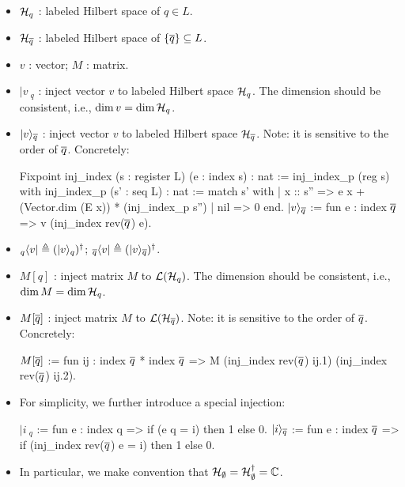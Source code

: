 \begin{itemize}
        \item ${\mathcal{H}}_q$ : labeled Hilbert space of $q\in L$.
        
        \item ${\mathcal{H}}_{\overline{q}}$ : labeled Hilbert space of $\{{\overline{q}}\}\subseteq L$.
        
        \item $v$ : vector; $M$ : matrix.
        
        \item $|v\>_q$ : inject vector $v$ to labeled Hilbert space ${\mathcal{H}}_q$. The dimension should be consistent, i.e., $\dim v = \dim {\mathcal{H}}_q$.
        
        \item $|v\rangle_{\overline{q}}$ : inject vector $v$ to labeled Hilbert space ${\mathcal{H}}_{\overline{q}}$. Note: it is sensitive to the order of ${\overline{q}}$. Concretely:
        \begin{coq}
        Fixpoint inj_index (s : register L) (e : index {s}) : nat := inj_index_p (reg s)
            with inj_index_p (s' : seq L) : nat :=
                match s' with
                | x :: s'' => e x + (Vector.dim (E x)) * (inj_index_p s'')
                | nil => 0
                end.
        $|v\rangle_{\overline{q}}$ := fun e : index {${\overline{q}}$} => v (inj_index rev(${\overline{q}}$) e).
        \end{coq}
        \vspace{-.7cm}
        
        \item ${}_q\langle v|\triangleq(|v\rangle_q)^\dag$; \quad ${}_{{\overline{q}}}\langle v| \triangleq (|v\rangle_{\overline{q}})^\dag$.
        
        \item $M[q]$ : inject matrix $M$ to ${\mathcal{L}}({\mathcal{H}}_q)$. The dimension should be consistent, i.e., $\dim M = \dim {\mathcal{H}}_q$.
        
        \item $M[{\overline{q}}]$ : inject matrix $M$ to ${\mathcal{L}}({\mathcal{H}}_{\overline{q}})$. Note: it is sensitive to the order of ${\overline{q}}$. Concretely:
        \begin{coq}
        $M[{\overline{q}}]$ := fun ij : index {${\overline{q}}$} * index {${\overline{q}}$} => M (inj_index rev(${\overline{q}}$) ij.1) (inj_index rev(${\overline{q}}$) ij.2).
        \end{coq}
        \vspace{-.7cm}
        \item For simplicity, we further introduce a special injection: 
        \begin{coq}
        $|i\>_q$ := fun e : index {q} => if (e q = i) then 1 else 0.
        $|i\rangle_{\overline{q}}$ := fun e : index {${\overline{q}}$} => if (inj_index rev(${\overline{q}}$) e = i) then 1 else 0.
        \end{coq}
        \vspace{-.7cm}
        
        \item In particular, we make convention that ${\mathcal{H}}_{\emptyset} = {\mathcal{H}}_{\emptyset}^\dag = {\mathbb{C}}$.
    \end{itemize}
    
